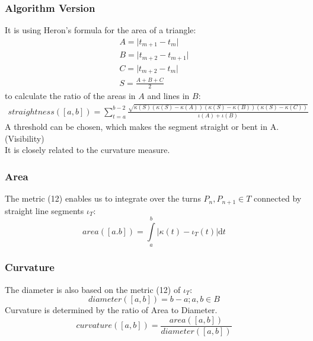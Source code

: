 \documentclass{article}
\begin{document}
\subsubsection{Algorithm Version}
It is using Heron's formula for the area of a triangle:
\begin{align*}
A=\lvert t_{m+1}-t_{m} \rvert\\
B=\lvert t_{m+2} - t_{m+1} \rvert\\
C=\lvert t_{m+2} - t_{m} \rvert\\
S=\frac{A+B+C}{2}
\end{align*}
to calculate the ratio of the areas in $A$ and lines in $B$:
\begin{align}
straightness([a,b])=\sum_{t=a}^{b-2}\frac{\sqrt{\kappa(S)(\kappa(S)-\kappa(A))(\kappa(S)-\kappa(B))(\kappa(S)-\kappa(C))}}{\iota(A)+\iota(B)}
\end{align}
\fi
A threshold can be chosen, which makes the segment straight or bent in A. (Visibility)\\
It is closely related to the curvature measure.

\subsubsection{Area}
The metric (12) enables us to integrate over the turns $P_{n},P_{n+1} \in T$ connected by straight line segments $\iota_{T}$:
\begin{equation}
area([a.b])=\int \limits _{a}^{b}\lvert \kappa(t)-\iota_{T}(t)\rvert \mathrm{d}t
\end{equation}
\iffalse
\subsubsection{Algorithm Version}
The integral of the area in the legal segment, so that:
\begin{align}
area([a,b])= \int \limits _{\kappa'_{x}(a)}^{\kappa'_{x}(b)} \kappa'_{y}(t)\mathrm{d}t
\end{align}
\fi

\subsubsection{Curvature}
\iffalse
\newcommand\norm[1]{\left\lVert#1\right\rVert}
Because the diameter has to be calculated piece-wise, we have to set up a vector space with the turns $P_{n},P_{n+1} \in T$.
\begin{equation}
v \in (B,\norm{\cdot})
\end{equation}
Note: It is a Banach space.\\
\fi
The diameter is also based on the metric (12) of $\iota_{T}$:
\begin{equation}
diameter([a,b])=b-a; a,b \in B
\end{equation}
Curvature is determined by the ratio of Area to Diameter.
\begin{equation}
curvature([a,b]) = \frac{area([a,b])}{diameter([a,b])}
\end{equation}
\end{document}
